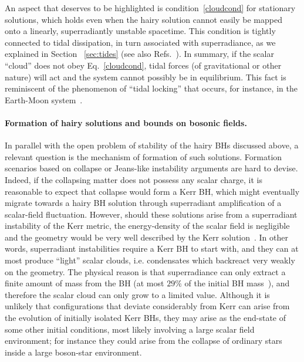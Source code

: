 \documentclass[11pt]{article}
\numberwithin{equation}{section} %
\begin{document}
An aspect that deserves to be highlighted is condition~\eqref{cloudcond} for stationary solutions, which holds even when 
the hairy solution cannot easily be mapped onto a linearly, superradiantly unstable spacetime. This condition is tightly 
connected to tidal dissipation, in turn associated with superradiance, as we explained in
Section ~\ref{sec:tides} (see also Refs.~\cite{Cardoso:2012zn,Brito:2012gw}). In summary, if the scalar ``cloud'' does 
not obey Eq.~\eqref{cloudcond}, tidal forces (of gravitational or other nature) will act and the system cannot possibly 
be in equilibrium. This fact is reminiscent of the phenomenon of ``tidal locking'' that occurs, for instance, in the 
Earth-Moon system~\cite{Cardoso:2012zn}.


\paragraph{Formation of hairy solutions and bounds on bosonic fields.}
In parallel with the open problem of stability of the hairy BHs discussed above, a relevant question is the mechanism of 
formation of such solutions. 
%
Formation scenarios based on collapse or Jeans-like instability arguments are hard to devise. Indeed, if the collapsing 
matter does not possess any scalar charge, it is reasonable to expect that collapse would form a Kerr BH, which might 
eventually migrate towards a hairy BH solution through superradiant amplification of a scalar-field fluctuation. 
However, should these solutions arise from a superradiant instability of 
the Kerr metric, the energy-density of the scalar field is negligible and the geometry would be very well described by 
the Kerr solution~\cite{Brito:2014wla}. In other words, superradiant instabilities require a Kerr BH to start with, and 
they can at most produce ``light'' scalar clouds, i.e. condensates which backreact very weakly on the geometry. The 
physical reason is that superradiance can only extract a finite amount of mass from the BH (at most $29\%$ of the 
initial BH mass~\cite{Begelman:2014aea}), and therefore the scalar cloud can only grow to a limited value. 
%
Although it is unlikely that configurations that deviate considerably from Kerr can arise from the evolution of 
initially isolated Kerr BHs, they may arise as the end-state of some other initial conditions, most likely involving a 
large scalar field environment; for instance they could arise from the collapse of ordinary stars inside a large 
boson-star environment.
\end{document}
